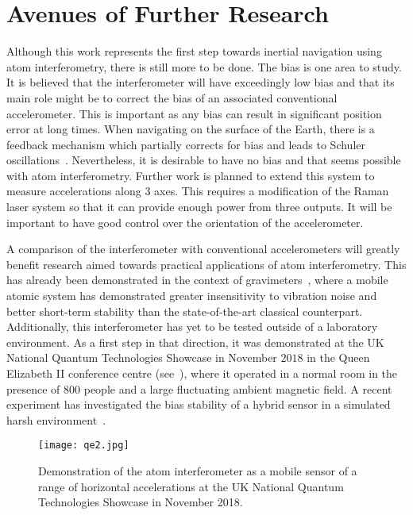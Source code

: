\section{Avenues of Further Research}
Although this work represents the first step towards inertial
navigation using atom interferometry, there is still more to be done.
The bias is one area to study. It is believed that the
interferometer will have exceedingly low bias and that its main role
might be to correct the bias of an associated conventional
accelerometer. This is important as any bias can result in significant
position error at long times. When navigating on the surface of the
Earth, there is a feedback mechanism which partially corrects for bias
and leads to Schuler oscillations~\cite{Schuler1923}. Nevertheless, it
is desirable to have no bias and that seems possible with atom
interferometry. Further work is planned to extend this system to measure accelerations
along 3 axes. This requires a modification of the Raman laser system so
that it can provide enough power from three outputs. It will be
important to have good control over the orientation of the
accelerometer.
\par\noindent
A comparison of the interferometer with conventional
accelerometers will greatly benefit research aimed towards
practical applications of atom interferometry. This has already been
demonstrated in the context of gravimeters~\cite{Farah2014,Gillot2014}, where a
mobile atomic system has demonstrated greater insensitivity to
vibration noise and better short-term stability than the
state-of-the-art classical counterpart. Additionally, this interferometer has
yet to be tested outside of a laboratory environment. As a first step
in that direction, it was demonstrated at the UK National Quantum
Technologies Showcase in November $2018$ in the Queen Elizabeth II
conference centre (see~), where it operated in a normal room in the
presence of 800 people and a large fluctuating ambient magnetic field. A recent
experiment has investigated the bias stability of a hybrid sensor in a
simulated harsh environment~\cite{Cheiney2018}.   
\begin{figure}[htpb]
  \centering
  \texttt{[image: qe2.jpg]}
  \caption{Demonstration of the atom interferometer as a mobile sensor
  of a range of horizontal accelerations at the UK National Quantum
Technologies Showcase in November 2018.}
\label{fig:qe2}
\end{figure}
